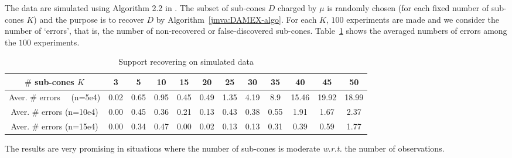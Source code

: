 The data are simulated using  Algorithm 2.2 in \cite{Stephenson2003}.
The subset of sub-cones $D$ charged by $\mu$ is randomly chosen (for each
fixed number of sub-cones $K$) and the purpose is to recover $D$ by Algorithm~\ref{jmva:DAMEX-algo}.
  For each $K$, $100$ experiments
are made and we consider  the  number of `errors', that is,      the number of
non-recovered or false-discovered sub-cones. Table~\ref{jmva:table:logevd} shows the averaged
numbers of errors  among the $100$ experiments. %
\begin{table}[!ht]
\caption{Support recovering on simulated data}
\label{jmva:table:logevd}
\centering
\resizebox{\linewidth}{!} {
\begin{tabular}{c ccccccccccc}
  \toprule
  $\#$ sub-cones $K$       &    3 & 5    &  10   & 15   & 20    & 25  & 30   & 35    & 40    & 45    & 50 \\
  \midrule
 Aver. $\#$ errors ~~(n=5e4)     & 0.02 & 0.65 & 0.95  & 0.45 & 0.49  & 1.35& 4.19 & 8.9  & 15.46  & 19.92  & 18.99 \\

 Aver. $\#$ errors (n=10e4)    & 0.00 & 0.45 & 0.36  & 0.21 & 0.13  & 0.43& 0.38 & 0.55  & 1.91  & 1.67  & 2.37 \\

 
 Aver. $\#$ errors (n=15e4)    & 0.00  & 0.34 & 0.47 & 0.00 & 0.02  & 0.13& 0.13 & 0.31  & 0.39  & 0.59  & 1.77 \\
  \bottomrule
\end{tabular}
}
\end{table}
The results are very promising in situations where the number of sub-cones is moderate \emph{w.r.t.} the number of observations. %

